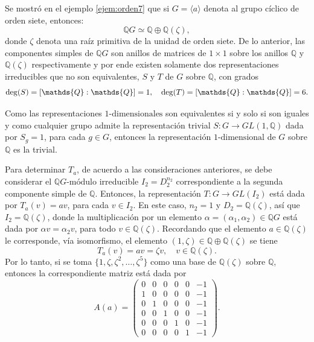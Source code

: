  \begin{ejemplo}
 Se mostró  en el ejemplo \ref{ejem:orden7} que si $G = \langle a \rangle$ denota al grupo cíclico de orden siete, entonces:
 \begin{equation*} \mathds{Q}G \simeq \mathds{Q}\oplus\mathds{Q}(\zeta), \end{equation*} donde $\zeta$ denota una raíz primitiva de la unidad de orden siete. De lo anterior, las componentes simples de $\mathds{Q}G$ son anillos de matrices de $1\times 1$ sobre los anillos $\mathds{Q}$ y $\mathds{Q}(\zeta)$ respectivamente y por ende existen solamente dos representaciones irreducibles que no son equivalentes, $S$ y $T$ de $G$ sobre $\mathds{Q}$, con grados
 \begin{equation*} \grado(S) = [\mathds{Q}:\mathds{Q}] = 1, \quad \grado(T) = [\mathds{Q}:\mathds{Q}] = 6. \end{equation*} 
 
 Como las representaciones $1\mbox{-dimensionales}$ son equivalentes si y solo si son iguales y como cualquier grupo admite la representación trivial $S \colon G \to GL(1,\mathds{Q})$ dada por $S_g = 1$, para cada $g \in G$, entonces la representación $1\mbox{-dimensional}$ de $G$ sobre $\mathds{Q}$ es la trivial.
 
 Para determinar $T_a$, de acuerdo a las consideraciones anteriores, se debe considerar el $\mathds{Q}G\mbox{-módulo}$ irreducible $I_2 = D_2^{n_2}$ correspondiente a la segunda componente simple de $\mathds{Q}$. Entonces, la representación $T \colon G \to GL(I_2)$ está dada por $T_a(v) = av$, para cada $v \in I_2$. En este caso, $n_2 = 1$ y $D_2 = \mathds{Q}(\zeta)$, así que $I_2 = \mathds{Q}(\zeta)$, donde la multiplicación por un elemento $\alpha = (\alpha_1, \alpha_2) \in \mathds{Q}G$ está dada por $\alpha v = \alpha_2v$, para todo $v \in \mathds{Q}(\zeta)$. Recordando que el elemento $a \in \mathds{Q}(\zeta)$ le corresponde, vía isomorfismo, el elemento $(1,\zeta) \in \mathds{Q}\oplus\mathds{Q}(\zeta)$ se tiene
 \begin{equation*} T_a(v) = av = \zeta v, \quad v 
 \in \mathds{Q}(\zeta). \end{equation*} Por lo tanto, si se toma $\{ 1, \zeta, \zeta^2, \dots, \zeta^5 \}$ como una base de $\mathds{Q}(\zeta)$ sobre $\mathds{Q}$, entonces la correspondiente matriz está dada por
 \begin{equation*} A(a) = \begin{pmatrix}
 0 & 0 & 0 & 0 & 0 & -1 \\
 1 & 0 & 0 & 0 & 0 & -1 \\
 0 & 1 & 0 & 0 & 0 & -1 \\
 0 & 0 & 1 & 0 & 0 & -1 \\
 0 & 0 & 0 & 1 & 0 & -1 \\
 0 & 0 & 0 & 0 & 1 & -1
 \end{pmatrix}. \end{equation*}
 \end{ejemplo}
